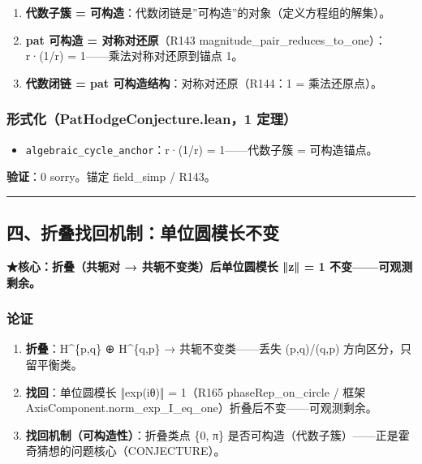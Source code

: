 \documentclass[
]{article}
\providecommand{\tightlist}{%
 \setlength{\itemsep}{0pt}\setlength{\parskip}{0pt}}
\begin{document}
\begin{enumerate}
\def\labelenumi{\arabic{enumi}.}
\tightlist
\item
 \textbf{代数子簇 =
 可构造}：代数闭链是''可构造''的对象（定义方程组的解集）。
\item
 \textbf{pat 可构造 = 对称对还原}（R143
 magnitude\_pair\_reduces\_to\_one）：r·(1/r) =
 1------乘法对称对还原到锚点 1。
\item
 \textbf{代数闭链 = pat 可构造结构}：对称对还原（R144：1 =
 乘法还原点）。
\end{enumerate}

\subsubsection{形式化（PatHodgeConjecture.lean，1
定理）}\label{ux5f62ux5f0fux5316pathodgeconjecture.lean1-ux5b9aux7406-2}

\begin{itemize}
\tightlist
\item
 \texttt{algebraic\_cycle\_anchor}：r·(1/r) = 1------代数子簇 =
 可构造锚点。
\end{itemize}

\textbf{验证}：0 sorry。锚定 field\_simp / R143。

\begin{center}\rule{0.5\linewidth}{0.5pt}\end{center}

\subsection{四、折叠找回机制：单位圆模长不变}\label{ux56dbux6298ux53e0ux627eux56deux673aux5236ux5355ux4f4dux5706ux6a21ux957fux4e0dux53d8}

\textbf{★核心：折叠（共轭对 → 共轭不变类）后单位圆模长 ‖z‖ = 1
不变------可观测剩余。}

\subsubsection{论证}\label{ux8bbaux8bc1-3}

\begin{enumerate}
\def\labelenumi{\arabic{enumi}.}
\tightlist
\item
 \textbf{折叠}：H\^{}\{p,q\} ⊕ H\^{}\{q,p\} → 共轭不变类------丢失
 (p,q)/(q,p) 方向区分，只留平衡类。
\item
 \textbf{找回}：单位圆模长 ‖exp(iθ)‖ = 1（R165 phaseRep\_on\_circle /
 框架 AxisComponent.norm\_exp\_I\_eq\_one）折叠后不变------可观测剩余。
\item
 \textbf{找回机制（可构造性）}：折叠类点 \{0, π\}
 是否可构造（代数子簇）------正是霍奇猜想的问题核心（CONJECTURE）。
\end{enumerate}
\end{document}
